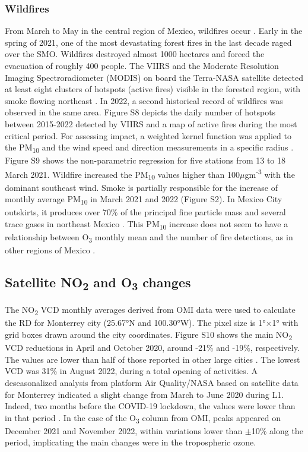 \documentclass[sn-mathphys-num]{sn-jnl}
\begin{document}
\subsubsection{Wildfires}
\label{sec:wildfiles}
From March to May in the central region of Mexico, wildfires occur \citep{Bravo_2002}. Early in the spring of 2021, one of the most devastating forest fires in the last decade raged over the SMO. Wildfires destroyed almost 1000 hectares and forced the evacuation of roughly 400 people. The VIIRS and the Moderate Resolution Imaging Spectroradiometer (MODIS) on board the Terra-NASA satellite detected at least eight clusters of hotspots (active fires) visible in the forested region, with smoke flowing northeast \citep{web}. In 2022, a second historical record of wildfires was observed in the same area. Figure S8 depicts the daily number of hotspots between 2015-2022 detected by VIIRS and a map of active fires during the most critical period. For assessing impact, a weighted kernel function was applied to the PM\textsubscript{10} and the wind speed and direction measurements in a specific radius \citep{Henry2009,Petit_2017,Ji_2019}. Figure S9 shows the non-parametric regression for five stations from 13 to 18 March 2021. Wildfire increased the PM\textsubscript{10} values higher than 100$\mu$gm\textsuperscript{-3} with the dominant southeast wind. Smoke is partially responsible for the increase of monthly average PM\textsubscript{10} in March 2021 and 2022 (Figure S2). In Mexico City outskirts, it produces over 70\% of the principal fine particle mass \citep{Yokelson_2007} and several trace gases in northeast Mexico \citep{Mendoza_2005}. This PM\textsubscript{10} increase does not seem to have a relationship between O\textsubscript{3} monthly mean and the number of fire detections, as in other regions of Mexico \citep{Carbajal_2015}.
\subsection{Satellite NO\textsubscript{2} and O\textsubscript{3} changes}
The NO\textsubscript{2} VCD monthly averages derived from OMI data \citep{Lamsal_2020} were used to calculate the RD for Monterrey city (25.67°N and 100.30°W). The pixel size is 1°$\times$1° with grid boxes drawn around the city coordinates. Figure S10 shows the main NO\textsubscript{2} VCD reductions in April and October 2020, around -21\% and -19\%, respectively. The values are lower than half of those reported in other large cities \citep{Bauwens2020}. The lowest VCD was 31\% in August 2022, during a total opening of activities. A deseasonalized analysis from platform Air Quality/NASA based on satellite data for Monterrey indicated a slight change from March to June 2020 during L1. Indeed, two months before the COVID-19 lockdown, the values were lower than in that period \citep{quality}. In the case of the O\textsubscript{3} column from OMI, peaks appeared on December 2021 and November 2022, within variations lower than \(\pm\)10\% along the period, implicating the main changes were in the tropospheric ozone.
\end{document}
